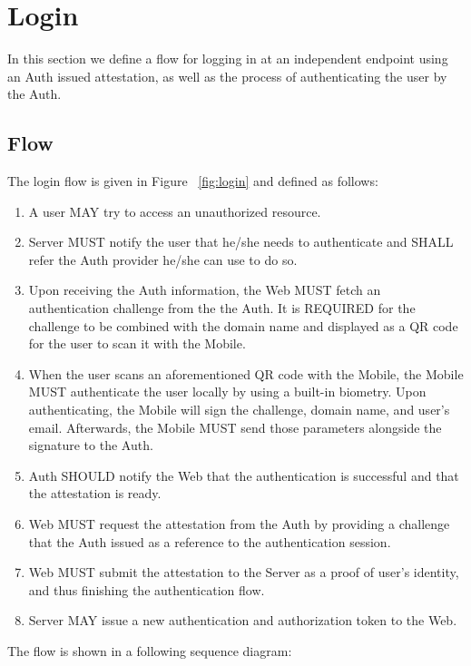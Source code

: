 \section{Login}
In this section we define a flow for logging in at an independent endpoint using an Auth
issued attestation, as well as the process of authenticating the user by the Auth. 

    \subsection{Flow}
    The login flow is given in Figure ~\ref{fig:login} and defined as follows:
        \begin{enumerate}
            \item A user MAY try to access an unauthorized resource.
            \item Server MUST notify the user that he/she needs to authenticate and SHALL refer the Auth provider 
                  he/she can use to do so.
            \item Upon receiving the Auth information, the Web MUST fetch an authentication challenge from the
                  the Auth. It is REQUIRED for the challenge to be combined with the domain name and displayed
                  as a QR code for the user to scan it with the Mobile.
            \item When the user scans an aforementioned QR code with the Mobile, the Mobile MUST authenticate the 
                  user locally by using a built-in biometry. Upon authenticating, the Mobile will sign the 
                  challenge, domain name, and user's email. Afterwards, the Mobile MUST send those parameters 
                  alongside the signature to the Auth.
            \item Auth SHOULD notify the Web that the authentication is successful and that the attestation is ready.
            \item Web MUST request the attestation from the Auth by providing a challenge that the Auth issued as a 
                  reference to the authentication session.
            \item Web MUST submit the attestation to the Server as a proof of user's identity, and thus finishing the
                  authentication flow.
            \item Server MAY issue a new authentication and authorization token to the Web.
        \end{enumerate}

    The flow is shown in a following sequence diagram: 
        

